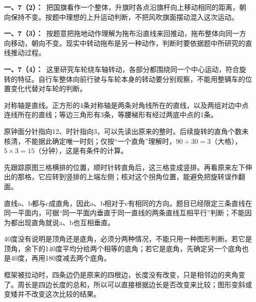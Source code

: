 \documentclass[multi=snippet,border=0pt]{standalone}
\newenvironment{snippet}[3]{\begin{minipage}{#1bp}\color{answerred}\fontsize{#2}{#3}\selectfont\raggedright}{\end{minipage}}
\begin{document}
\begin{snippet}{505}{11.5}{14}\textbf{一、7（2）：}\ 把国旗看作一个整体，升旗时各点沿旗杆向上移动相同的距离，朝向保持不变。按题中理想的上升运动判断，不把风吹旗面摆动混入这次运动。\end{snippet}
\begin{snippet}{505}{11.5}{14}\textbf{一、7（3）：}\ 按题意把拖地动作理解为拖布沿直线来回推动，拖布整体向同一方向移动，朝向不变。现实中转动拖布是另一种动作，判断时要依据题中所研究的直线推动过程。\end{snippet}
\begin{snippet}{505}{11.5}{14}\textbf{一、7（4）：}\ 这里研究车轮绕车轴转动，各部分都围绕同一个中心运动，符合旋转的特征。自行车整体向前行驶与车轮本身的转动要分别观察，不能用整辆车的位置变化代替对车轮的判断。\end{snippet}
\begin{snippet}{505}{11.5}{14}对称轴是直线。正方形的4条对称轴是两条对角线所在的直线，以及两组对边中点连线所在的直线；等边三角形有3条，等腰梯形有经过两底中点的1条。\end{snippet}
\begin{snippet}{505}{11.5}{14}原钟面分针指向12、时针指向3，可以先读出原来的整时。后续旋转的直角个数未核清，不能据此确定唯一时刻；仅按“一个直角”理解时，\(90\div30=3\)（大格），\(5\times3=15\)（分钟），这是有条件的计算。\end{snippet}
\begin{snippet}{505}{11.5}{14}先跟踪原图三格横排的位置，顺时针转直角后，这三格变成竖排。再看原来左下伸出的那格，它应转到竖排的上端左侧；核对这个拐角位置，能避免把旋转误作翻面。\end{snippet}
\begin{snippet}{505}{11.5}{14}直线a、b都与c成直角，因此a、b相对于c有相同的方向。题目已经限定三条直线在同一平面内，可据“同一平面内垂直于同一直线的两条直线互相平行”判断；不能因为都出现直角就说a、b也互相垂直。\end{snippet}
\begin{snippet}{505}{11.5}{14}40度没有说明是顶角还是底角，必须分两种情况，不能只用一种图形判断。若它是顶角，余下的140度平均分给两个相等的底角；若它是底角，先确定另一个底角也是40度，再用180度减去两个底角。\end{snippet}
\begin{snippet}{505}{11.5}{14}框架被拉动时，四条边仍是原来的四根边，长度没有改变，只是相邻边的夹角变了。周长是四边长度的总和，所以可以直接根据边长是否改变来比较；图形变斜或变矮并不改变这次比较的结果。\end{snippet}
\end{document}
